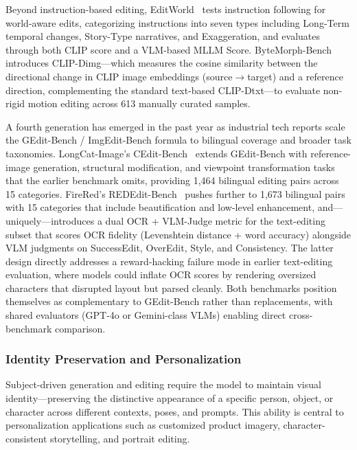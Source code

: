 Beyond instruction-based editing, EditWorld~\citep{EditWorld} tests instruction following for world-aware edits, categorizing instructions into seven types including Long-Term temporal changes, Story-Type narratives, and Exaggeration, and evaluates through both CLIP score and a VLM-based MLLM Score. ByteMorph-Bench~\citep{ByteMorph} introduces CLIP-Dimg---which measures the cosine similarity between the directional change in CLIP image embeddings (source$\to$target) and a reference direction, complementing the standard text-based CLIP-Dtxt---to evaluate non-rigid motion editing across 613 manually curated samples.

A fourth generation has emerged in the past year as industrial tech reports scale the GEdit-Bench / ImgEdit-Bench formula to bilingual coverage and broader task taxonomies. LongCat-Image's CEdit-Bench~\citep{team2025longcat} extends GEdit-Bench with reference-image generation, structural modification, and viewpoint transformation tasks that the earlier benchmark omits, providing 1{,}464 bilingual editing pairs across 15 categories. FireRed's REDEdit-Bench~\citep{team2026firered} pushes further to 1{,}673 bilingual pairs with 15 categories that include beautification and low-level enhancement, and---uniquely---introduces a dual OCR + VLM-Judge metric for the text-editing subset that scores OCR fidelity (Levenshtein distance + word accuracy) alongside VLM judgments on SuccessEdit, OverEdit, Style, and Consistency. The latter design directly addresses a reward-hacking failure mode in earlier text-editing evaluation, where models could inflate OCR scores by rendering oversized characters that disrupted layout but parsed cleanly. Both benchmarks position themselves as complementary to GEdit-Bench rather than replacements, with shared evaluators (GPT-4o or Gemini-class VLMs) enabling direct cross-benchmark comparison.


\subsubsection{Identity Preservation and Personalization}

Subject-driven generation and editing require the model to maintain visual identity---preserving the distinctive appearance of a specific person, object, or character across different contexts, poses, and prompts. This ability is central to personalization applications such as customized product imagery, character-consistent storytelling, and portrait editing.

